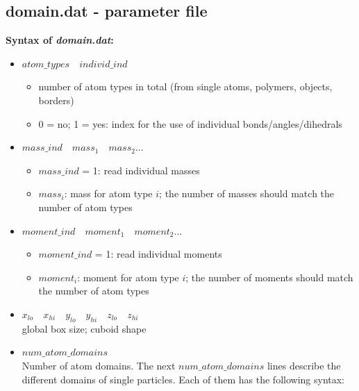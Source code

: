 \documentclass[a4paper,10pt]{scrreprt}
\begin{document}
\subsection{domain.dat - parameter file}
\textbf{Syntax of \textit{domain.dat}:}
\begin{itemize}

\item $  atom\_types \quad   individ\_ind $
	\begin{itemize}
	\item number of atom types in total (from single atoms, polymers, objects, borders)
	\item 0 = no; 1 = yes: index for the use of individual bonds/angles/dihedrals
	\end{itemize}

\item $  mass\_ind \quad   mass_1 \quad   mass_2 ... $
	\begin{itemize}
	\item $ mass\_ind$ = 1: read individual masses
	\item $ mass_i$: mass for atom type $i$; the number of masses should match the number of atom types
	\end{itemize}

\item $  moment\_ind \quad   moment_1 \quad   moment_2 ... $
	\begin{itemize}
	\item $ moment\_ind$ = 1: read individual moments
	\item $ moment_i$: moment for atom type $i$; the number of moments should match the number of atom types
	\end{itemize}

\item $ x_{lo} \quad x_{hi} \quad y_{lo} \quad y_{hi} \quad z_{lo} \quad z_{hi} $ \\
	{ global box size; cuboid shape}

\item $num\_atom\_domains$ \\
	{Number of atom domains. The next $num\_atom\_domains$ lines describe the different domains of single particles. Each of them has the following syntax:}


\end{itemize}
\end{document}
